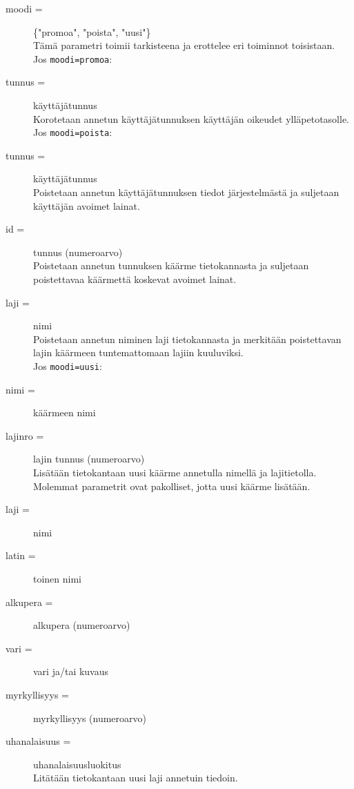 \documentclass[11pt]{article}
\begin{document}
\begin{description}

\item[moodi =] \{"promoa", "poista", "uusi"\} \hfill \\
Tämä parametri toimii tarkisteena ja erottelee eri toiminnot toisistaan. \\

Jos \texttt{moodi=promoa}:

\item[tunnus =] käyttäjätunnus \hfill \\
Korotetaan annetun käyttäjätunnuksen käyttäjän oikeudet ylläpetotasolle. \\

Jos \texttt{moodi=poista}:

\item[tunnus =] käyttäjätunnus \hfill \\
Poistetaan annetun käyttäjätunnuksen tiedot järjestelmästä ja suljetaan käyttäjän avoimet lainat.

\item[id =] tunnus (numeroarvo) \hfill \\
Poistetaan annetun tunnuksen käärme tietokannasta ja suljetaan poistettavaa käärmettä koskevat avoimet lainat.

\item[laji =] nimi \hfill \\
Poistetaan annetun niminen laji tietokannasta ja merkitään poistettavan lajin käärmeen tuntemattomaan lajiin kuuluviksi. \\

Jos \texttt{moodi=uusi}:

\item[nimi =] käärmeen nimi
\item[lajinro =] lajin tunnus (numeroarvo) \hfill \\
Lisätään tietokantaan uusi käärme annetulla nimellä ja lajitietolla. Molemmat parametrit ovat pakolliset, jotta uusi käärme lisätään.

\item[laji =] nimi
\item[latin =] toinen nimi
\item[alkupera =] alkupera (numeroarvo)
\item[vari =] vari ja/tai kuvaus
\item[myrkyllisyys =] myrkyllisyys (numeroarvo)
\item[uhanalaisuus =] uhanalaisuusluokitus \hfill \\
Litätään tietokantaan uusi laji annetuin tiedoin.
\end{description}
\end{document}
